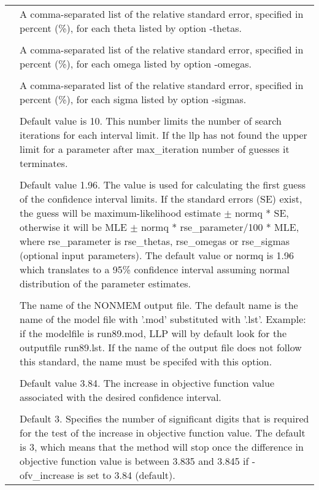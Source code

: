 \documentclass[a4paper,12pt]{article}
\begin{document}
\begin{longtable}{p{1in}p{4in}}
\verb%-rse_thetas=<list>% & \\
\nopagebreak
 & A comma-separated list of the relative standard error, specified in percent (\%), for each theta listed by option -thetas. \\
\\
\verb%-rse_omegas=<list>% & \\
\nopagebreak
 & A comma-separated list of the relative standard error, specified in percent (\%), for each omega listed by option -omegas. \\
\\
\verb%-rse_sigmas=<list>% & \\
\nopagebreak
 & A comma-separated list of the relative standard error, specified in percent (\%), for each sigma listed by option -sigmas. \\
\\
\verb%-max_iterations=N% & \\
\nopagebreak
 & Default value is 10. This number limits the number of search iterations for each interval limit. If the llp has not found the upper limit for a parameter after max\_iteration number of guesses it terminates. \\
\\
\verb%-normq=X% & \\
\nopagebreak
 & Default value 1.96. The value is used for calculating the first guess of the confidence interval limits. If the standard errors (SE) exist, the guess will be maximum-likelihood estimate $\pm$ normq * SE, otherwise it will be MLE $\pm$ normq * rse\_parameter/100 * MLE, where rse\_parameter is rse\_thetas, rse\_omegas or rse\_sigmas (optional input parameters). The default value or normq is 1.96 which translates to a 95\% confidence interval assuming normal distribution of the parameter estimates. \\
\\
\verb%-outputfile=<filename>% & \\
\nopagebreak
 & The name of the NONMEM output file. The default name is the name of the model file with '.mod' substituted with '.lst'. Example: if the modelfile is run89.mod, LLP will by default look for the outputfile run89.lst. If the name of the output file does not follow this standard, the name must be specifed with this option. \\
\\
\verb%-ofv_increase=X% & \\
\nopagebreak
 & Default value 3.84. The increase in objective function value associated with the desired confidence interval. \\
\\
\verb%-significant_digits=N% & \\
\nopagebreak
 & Default 3. Specifies the number of significant digits that is required for the test of the increase in objective function value. The default is 3, which means that the method will stop once the difference in objective function value is between 3.835 and 3.845 if -ofv\_increase is set to 3.84 (default). \\
\end{longtable}
\end{document}
